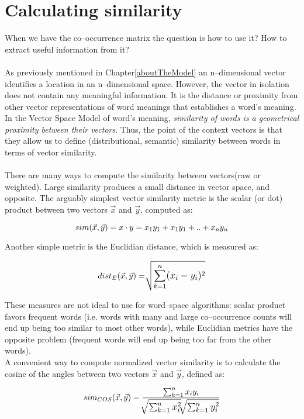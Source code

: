 \section{Calculating similarity}
When we have the co--occurrence matrix the question is how to use it? How to extract useful information from it? 
\\\\
As previously mentioned in Chapter\ref{aboutTheModel} an n--dimensional vector identifies a location in 
an n--dimensional space. However, the vector in isolation does not contain any meaningful information. It is 
the distance or proximity from other vector representations of word meanings that establishes a word's 
meaning. In the Vector Space Model of word's meaning, \textit{similarity of words is a geometrical 
proximity between their vectors}. Thus, the point of the context vectors is that they allow us to define 
(distributional, semantic) similarity between words in terms of vector similarity.
\\\\  
There are many ways to compute the similarity between vectors(raw or weighted). Large similarity 
produces a small distance in vector space, and opposite. The arguably simplest vector similarity metric is 
the scalar (or dot) product between two vectors $\vec x$ and $\vec y$, computed as:
\begin{center}
\begin{equation}
\large{
sim(\vec x,\vec y) = x \cdot y = x_{1}y_{1} + x_{1}y_{1}+ .. + x_{n}y_{n}
}
\end{equation}
\end{center}
Another simple metric is the Euclidian distance, which is measured as:
\begin{center}
\begin{equation}
\large{
dist_{E}(\vec x ,\vec y) =  \sqrt []{\sum_{k=1}^n (x_{i}-y_{i})^{2}}  
}
\end{equation}
\end{center}
These measures are not ideal to use for word--space algorithms: scalar product favors frequent words (i.e. words with many and large co--occurrence counts will end up being too similar to most other words), while Euclidian metrics have the opposite problem (frequent words will end up being too far from the other words).
\\A convenient way to compute normalized vector similarity is to calculate the cosine of the angles between two vectors $\vec x$ and $\vec y$, defined as:
\begin{center}
\begin{equation}
\large{
sim_{COS}(\vec x ,\vec y) =  \frac{\sum_{k=1}^n x_{i}y_{i} }{\sqrt []{\sum_{k=1}^n x_{i}^{2}} \sqrt []{\sum_{k=1}^n y_{i}^{2}}} 
}
\end{equation}
\end{center}

